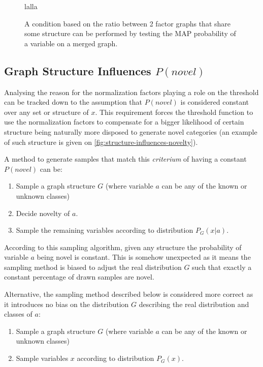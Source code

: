 
\begin{figure}[h]
\centering
lalla
\caption{\label{fig:merging-graphs}A condition based on the ratio between 2
         factor graphs that share some structure can be performed by testing the
         MAP probability of a variable on a merged graph.}
\end{figure}

\subsection{Graph Structure Influences $P(novel)$}
Analysing the reason for the normalization factors playing a role on the
threshold can be tracked down to the assumption that $P(novel)$ is
considered constant over any set or structure of $x$.
This requirement forces the threshold function to use the normalization factors
to compensate for a bigger likelihood of certain structure being naturally more
disposed to generate novel categories (an example of such structure is given on
\autoref{fig:structure-influences-novelty}).

A method to generate samples that match this \emph{criterium} of
having a constant $P(novel)$ can be:

\begin{algorithm}
\begin{enumerate}
\item Sample a graph structure $G$ (where variable $a$ can be any of the known or unknown classes)
\item Decide novelty of $a$.
\item Sample the remaining variables according to distribution $P_G(x|a)$.
\end{enumerate}
\end{algorithm}


According to this sampling algorithm, given any structure the probability of
variable $a$ being novel is constant. This is somehow unexpected as it means
the sampling method is biased to adjust the real distribution $G$ such that
exactly a constant percentage of drawn samples are novel.

Alternative, the sampling method described below is considered more correct as
it introduces no bias on the distribution $G$ describing the real distribution
and classes of $a$:
\begin{algorithm}
\begin{enumerate}
\item Sample a graph structure $G$ (where variable $a$ can be any of the known or unknown classes)
\item Sample variables $x$ according to distribution $P_G(x)$.
\end{enumerate}
\end{algorithm}

